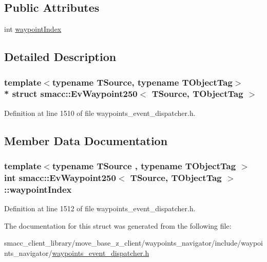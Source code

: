 \subsection*{Public Attributes}
\begin{DoxyCompactItemize}
\item 
int \hyperlink{structsmacc_1_1EvWaypoint250_a59b0e9b83d88c9e4718e94f7a9982459}{waypoint\+Index}
\end{DoxyCompactItemize}


\subsection{Detailed Description}
\subsubsection*{template$<$typename T\+Source, typename T\+Object\+Tag$>$\\*
struct smacc\+::\+Ev\+Waypoint250$<$ T\+Source, T\+Object\+Tag $>$}



Definition at line 1510 of file waypoints\+\_\+event\+\_\+dispatcher.\+h.



\subsection{Member Data Documentation}
\subsubsection[{\texorpdfstring{waypoint\+Index}{waypointIndex}}]{\setlength{\rightskip}{0pt plus 5cm}template$<$typename T\+Source , typename T\+Object\+Tag $>$ int {\bf smacc\+::\+Ev\+Waypoint250}$<$ T\+Source, T\+Object\+Tag $>$\+::waypoint\+Index}\hypertarget{structsmacc_1_1EvWaypoint250_a59b0e9b83d88c9e4718e94f7a9982459}{}\label{structsmacc_1_1EvWaypoint250_a59b0e9b83d88c9e4718e94f7a9982459}


Definition at line 1512 of file waypoints\+\_\+event\+\_\+dispatcher.\+h.



The documentation for this struct was generated from the following file\+:\begin{DoxyCompactItemize}
\item 
smacc\+\_\+client\+\_\+library/move\+\_\+base\+\_\+z\+\_\+client/waypoints\+\_\+navigator/include/waypoints\+\_\+navigator/\hyperlink{waypoints__event__dispatcher_8h}{waypoints\+\_\+event\+\_\+dispatcher.\+h}\end{DoxyCompactItemize}

